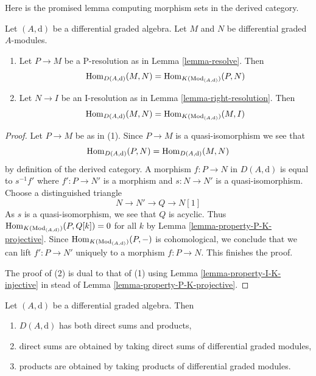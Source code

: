 \noindent
Here is the promised lemma computing morphism sets in the
derived category.

\begin{lemma}
\label{lemma-hom-derived}
Let $(A, \text{d})$ be a differential graded algebra.
Let $M$ and $N$ be differential graded $A$-modules.
\begin{enumerate}
\item Let $P \to M$ be a P-resolution as in
Lemma \ref{lemma-resolve}. Then
$$
\mathop{\mathrm{Hom}}\nolimits_{D(A, \text{d})}(M, N) =
\mathop{\mathrm{Hom}}\nolimits_{K(\text{Mod}_{(A, \text{d})})}(P, N)
$$
\item Let $N \to I$ be an I-resolution as in
Lemma \ref{lemma-right-resolution}. Then
$$
\mathop{\mathrm{Hom}}\nolimits_{D(A, \text{d})}(M, N) =
\mathop{\mathrm{Hom}}\nolimits_{K(\text{Mod}_{(A, \text{d})})}(M, I)
$$
\end{enumerate}
\end{lemma}

\begin{proof}
Let $P \to M$ be as in (1). Since $P \to M$ is a quasi-isomorphism we see that
$$
\mathop{\mathrm{Hom}}\nolimits_{D(A, \text{d})}(P, N) = \mathop{\mathrm{Hom}}\nolimits_{D(A, \text{d})}(M, N)
$$
by definition of the derived category. A morphism
$f : P \to N$ in $D(A, \text{d})$ is equal to
$s^{-1}f'$ where $f' : P \to N'$ is a morphism and
$s : N \to N'$ is a quasi-isomorphism. Choose a distinguished triangle
$$
N \to N' \to Q \to N[1]
$$
As $s$ is a quasi-isomorphism, we see that $Q$ is acyclic. Thus
$\mathop{\mathrm{Hom}}\nolimits_{K(\text{Mod}_{(A, \text{d})})}(P, Q[k]) = 0$ for all $k$ by
Lemma \ref{lemma-property-P-K-projective}. Since
$\mathop{\mathrm{Hom}}\nolimits_{K(\text{Mod}_{(A, \text{d})})}(P, -)$
is cohomological, we conclude that we can lift $f' : P \to N'$
uniquely to a morphism $f : P \to N$. This finishes the proof.

\medskip\noindent
The proof of (2) is dual to that of (1) using
Lemma \ref{lemma-property-I-K-injective} in stead of
Lemma \ref{lemma-property-P-K-projective}.
\end{proof}

\begin{lemma}
\label{lemma-derived-products}
Let $(A, \text{d})$ be a differential graded algebra. Then
\begin{enumerate}
\item $D(A, \text{d})$ has both direct sums and products,
\item direct sums are obtained by taking direct sums of differential graded
modules,
\item products are obtained by taking products of differential
graded modules.
\end{enumerate}
\end{lemma}

